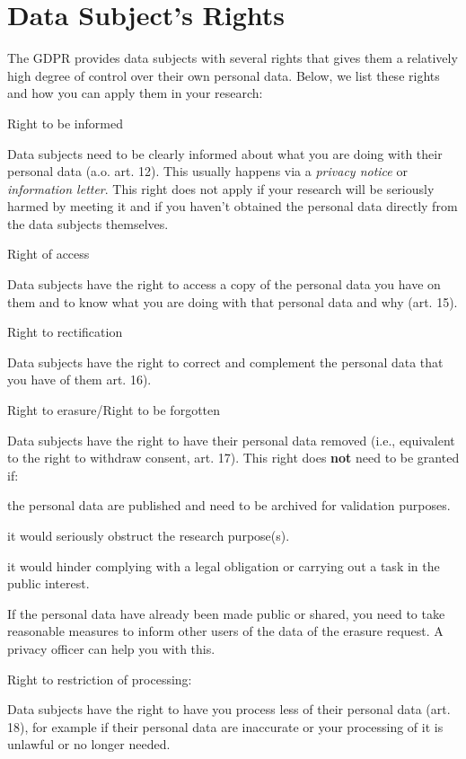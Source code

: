 \documentclass[
]{book}
\begin{document}
\hypertarget{data-subject-rights}{%
\section{Data Subject's Rights}\label{data-subject-rights}}

The GDPR provides data subjects with several rights that gives them a relatively
high degree of control over their own personal data. Below, we list these rights
and how you can apply them in your research:

Right to be informed

Data subjects need to be clearly informed about what you are doing with their
personal data (a.o. art. 12).
This usually happens via a \emph{privacy notice} or \emph{information letter}. This right
does not apply if your research will be seriously harmed by meeting it and if
you haven't obtained the personal data directly from the data subjects themselves.

Right of access

Data subjects have the right to access a copy of the personal data you have
on them and to know what you are doing with that personal data and why
(art. 15).

Right to rectification

Data subjects have the right to correct and complement the personal data
that you have of them
art. 16).

Right to erasure/Right to be forgotten

Data subjects have the right to have their personal data removed (i.e.,
equivalent to the right to withdraw consent,
art. 17).
This right does \textbf{not} need to be granted if:

the personal data are published and need to be archived for validation
purposes.

it would seriously obstruct the research purpose(s).

it would hinder complying with a legal obligation or carrying out a task
in the public interest.

If the personal data have already been made public or shared, you need to
take reasonable measures to inform other users of the data of the erasure
request. A privacy officer can help you with this.

Right to restriction of processing:

Data subjects have the right to have you process less of their personal data
(art. 18),
for example if their personal data are inaccurate or your processing of it
is unlawful or no longer needed.
\end{document}
